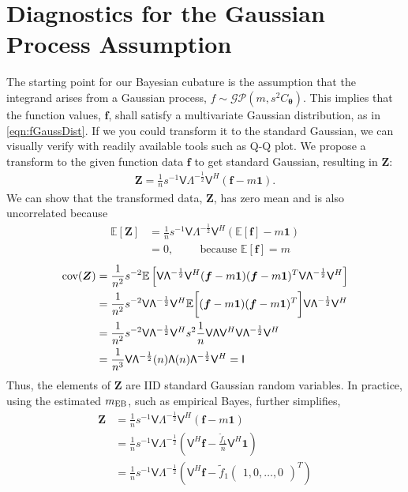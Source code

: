 \documentclass{svjour3}                     %
\newcommand{\bm}[1]{\boldsymbol{#1}}
\newcommand{\Ex}{\mathbb{E}}
\newcommand{\vtheta}{{\bm{\theta}}}
\newcommand{\vf}{\bm{f}}
\newcommand{\vZ}{\bm{Z}}
\newcommand{\vone}{\bm{1}}
\newcommand{\cov}{{\textup{cov}}}
\newcommand{\mLambda}{\mathsf{\Lambda}}
\newcommand{\mV}{\mathsf{V}}
\newcommand{\MLE}{\textup{EB}}
\begin{document}
\section{Diagnostics for the Gaussian Process Assumption}
\label{sec:gauss-diagnostics}

The starting point for our Bayesian cubature is the assumption that the integrand arises from a Gaussian process,  $f \sim \mathcal{GP}(m,s^2 C_\vtheta)$. This implies that the function values, $\vf$, shall satisfy a multivariate Gaussian distribution, as in \eqref{eqn:fGaussDist}. If we you could transform it to the standard Gaussian, we can visually verify with readily available tools such as Q-Q plot. We propose a transform to the given function data $\vf$ to get standard Gaussian, resulting in $\vZ$:
\begin{align}
	\label{gauss_diagnostics_tx}
	\vZ = \frac 1n s^{-1} \mV \mLambda^{-\frac 12} \mV^H(\vf - m \vone).
\end{align} 
We can show that the transformed data, $\vZ$, has zero mean and is also uncorrelated because
\begin{align*}
\Ex\left[\vZ \right] &= 
\frac 1n s^{-1} \mV \mLambda^{-\frac 12} \mV^H(\Ex\left[\vf\right] - m \vone) 
\\
& = 0, \hspace{1cm} \text{because } \Ex\left[\vf\right] = m
\end{align*}
\begin{align*}
\cov (\vZ) 
&= \frac {1}{n^2} s^{-2} \Ex\left[  
\mV \mLambda^{-\frac 12} \mV^H (\vf - m \vone)
(\vf - m \vone)^T \mV \mLambda^{-\frac 12} \mV^H
\right]
\\
&=
\frac {1}{n^2} s^{-2} \mV \mLambda^{-\frac 12} \mV^H 
\Ex \biggl[ (\vf - m \vone)
(\vf - m \vone)^T \biggr] \mV \mLambda^{-\frac 12} \mV^H
\\ %
&=
\frac{1}{n^2} s^{-2} \mV \mLambda^{-\frac 12} \mV^H 
 s^{2} \frac 1n \mV \mLambda \mV^H \mV \mLambda^{-\frac 12} \mV^H
\\
&=
\frac{1}{n^3} \mV \mLambda^{-\frac 12} (n) \mLambda (n) \mLambda^{-\frac 12} \mV^H
= \mathsf{I}
\end{align*}
Thus, the elements of $\vZ$ are IID standard Gaussian random variables.  
In practice, using the estimated $m_\MLE$, such as empirical Bayes, further simplifies, 
\begin{align*}
\vZ &= \frac 1n s^{-1} \mV \mLambda^{-\frac 12} \mV^H(\vf - m \vone) \\
&= \frac 1n s^{-1} \mV \mLambda^{-\frac 12} (\mV^H \vf - \frac{\tilde{f}_1}{n} \mV^H \vone) 
\\
&= \frac 1n s^{-1} \mV \mLambda^{-\frac 12} \left(\mV^H \vf - \tilde{f}_1 \begin{pmatrix}1, 0, \hdots, 0 \end{pmatrix}^T \right) 
\end{align*}
\end{document}
